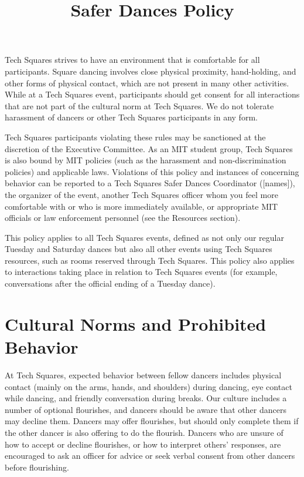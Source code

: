 \documentclass{article}
\title{Safer Dances Policy}
\date{}
\begin{document}
\maketitle

Tech Squares strives to have an environment that is comfortable for all participants. Square dancing involves close physical proximity, hand-holding, and other forms of physical contact, which are not present in many other activities. While at a Tech Squares event, participants should get consent for all interactions that are not part of the cultural norm at Tech Squares. We do not tolerate harassment of dancers or other Tech Squares participants in any form.

Tech Squares participants violating these rules may be sanctioned at the discretion of the Executive Committee. As an MIT student group, Tech Squares is also bound by MIT policies (such as the harassment and non-discrimination policies) and applicable laws. Violations of this policy and instances of concerning behavior can be reported to a Tech Squares Safer Dances Coordinator ([names]), the organizer of the event, another Tech Squares officer whom you feel more comfortable with or who is more immediately available, or appropriate MIT officials or law enforcement personnel (see the Resources section).

This policy applies to all Tech Squares events, defined as not only our regular Tuesday and Saturday dances but also all other events using Tech Squares resources, such as rooms reserved through Tech Squares. This policy also applies to interactions taking place in relation to Tech Squares events (for example, conversations after the official ending of a Tuesday dance).

\section{Cultural Norms and Prohibited Behavior}

At Tech Squares, expected behavior between fellow dancers includes physical contact (mainly on the arms, hands, and shoulders) during dancing, eye contact while dancing, and friendly conversation during breaks. Our culture includes a number of optional flourishes, and dancers should be aware that other dancers may decline them. Dancers may offer flourishes, but should only complete them if the other dancer is also offering to do the flourish. Dancers who are unsure of how to accept or decline flourishes, or how to interpret others' responses, are encouraged to ask an officer for advice or seek verbal consent from other dancers before flourishing.
\end{document}
